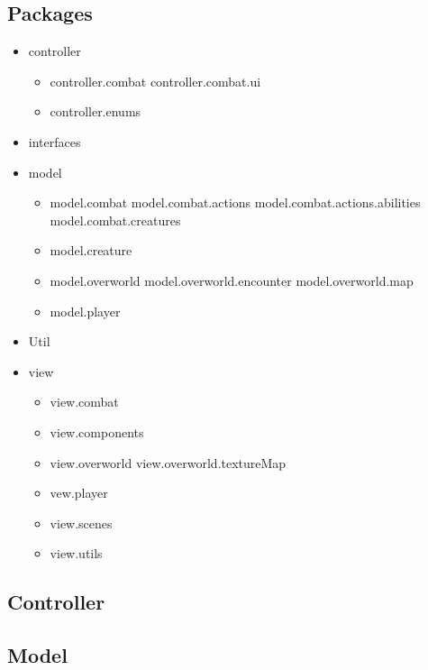 \subsection{Packages}
\begin{itemize}
	\item controller
	      \begin{itemize}
		      \item controller.combat
		            \subitem controller.combat.ui
		      \item controller.enums
	      \end{itemize}
	\item interfaces
	\item model
	      \begin{itemize}
		      \item model.combat
		            \subitem model.combat.actions
		            \subitem model.combat.actions.abilities
		            \subitem model.combat.creatures
		      \item model.creature
		      \item model.overworld
		            \subitem model.overworld.encounter
		            \subitem model.overworld.map
		      \item model.player
	      \end{itemize}
	\item Util
	\item view
	      \begin{itemize}
		      \item view.combat
		      \item view.components
		      \item view.overworld
		            \subitem view.overworld.textureMap
		      \item vew.player
		      \item view.scenes
		      \item view.utils
	      \end{itemize}
\end{itemize}

\subsection{Controller}

\subsection{Model}

